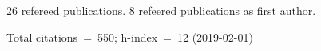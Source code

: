 26 refereed publications. 8 refeered publications as first author.

Total citations~=~550; h-index~=~12 (2019-02-01)